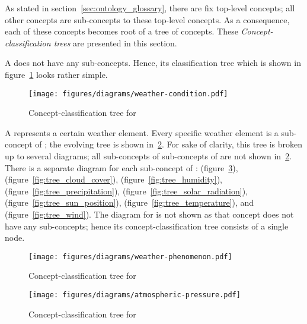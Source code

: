 As stated in section~\ref{sec:ontology_glossary}, there are fix top-level concepts; all other concepts are sub-concepts to these top-level concepts. As a consequence, each of these concepts becomes root of a tree of concepts. These \emph{Concept-classification trees} are presented in this section.

A  does not have any sub-concepts. Hence, its classification tree which is shown in figure~\ref{fig:tree_weather_condition} looks rather simple.

\begin{figure}
  \centering
  \texttt{[image: figures/diagrams/weather-condition.pdf]}
  \caption{Concept-classification tree for }
  \label{fig:tree_weather_condition}
\end{figure}

A  represents a certain weather element. Every specific weather element is a sub-concept of ; the evolving tree is shown in~\ref{fig:tree_weather_phenomenon}. For sake of clarity, this tree is broken up to several diagrams; all sub-concepts of sub-concepts of  are not shown in~\ref{fig:tree_weather_phenomenon}. There is a separate diagram for each sub-concept of :  (figure~\ref{fig:tree_atmospheric_pressure}),  (figure~\ref{fig:tree_cloud_cover}),  (figure~\ref{fig:tree_humidity}),  (figure~\ref{fig:tree_precipitation}),  (figure~\ref{fig:tree_solar_radiation}),  (figure~\ref{fig:tree_sun_position}),  (figure~\ref{fig:tree_temperature}), and  (figure~\ref{fig:tree_wind}). The diagram for  is not shown as that concept does not have any sub-concepts;
 hence its concept-classification tree consists of a single node.

\begin{figure}
  \centering
  \texttt{[image: figures/diagrams/weather-phenomenon.pdf]}
  \caption{Concept-classification tree for }
  \label{fig:tree_weather_phenomenon}
\end{figure}

\begin{figure}
  \centering
  \texttt{[image: figures/diagrams/atmospheric-pressure.pdf]}
  \caption{Concept-classification tree for }
  \label{fig:tree_atmospheric_pressure}
\end{figure}

